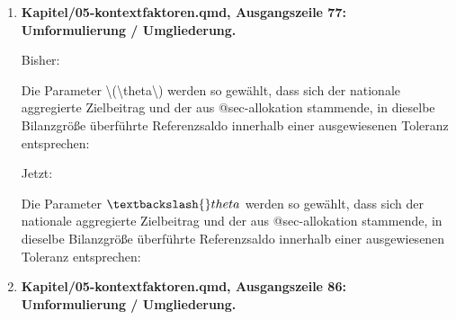 \documentclass[
  ngerman,
  a4paper,
  DIV=11]{scrreprt}
\newenvironment{Shaded}{\begin{snugshade}}{\end{snugshade}}
\newcommand{\NormalTok}[1]{\textcolor[rgb]{0.00,0.23,0.31}{#1}}
\begin{document}
\begin{enumerate}
\begin{Shaded}
\begin{Highlighting}[]
\NormalTok{Die Beiträge \textbackslash{}(b\_\{k,j\}\^{}\{\textbackslash{}mathrm\{ref\}\}\textbackslash{}) und \textbackslash{}(t\_\{k,j\}\^{}\{\textbackslash{}mathrm\{PEQ\}\}\textbackslash{}) müssen hier in derselben auf BGF bezogenen, national aggregierbaren Bilanzgröße ausgedrückt sein. Die Ziel{-} und Flächenbezüge sind vor der Aggregation zu harmonisieren: Ein PEQ{-}Zielwert in kWh PE/(m² NGF·a) kann nicht unmittelbar mit nationaler BGF multipliziert werden. Ebenso kann eine in PJ **elektrischer Energie** ausgewiesene nationale Sektorbilanz nicht ohne Definition und Umrechnung mit einem Primärenergiesaldo gleichgesetzt werden. Diese Umrechnung – einschließlich NGF/BGF und geeigneter PE{-}Gewichtung – gehört ausdrücklich zur Kalibrierrechnung und zu ihrer Dokumentation.}
\end{Highlighting}
\end{Shaded}

  Jetzt:

\begin{Shaded}
\begin{Highlighting}[]
\NormalTok{Die Beiträge werden als jährliche elektrische Energie je BGF aggregiert. Für NGF{-}bezogene Kennwerte gilt der dokumentierte Flächenfaktor; die PE{-}Bewertung folgt getrennt in der Quartiersbilanz.}
\end{Highlighting}
\end{Shaded}
\item
  \textbf{Kapitel/05-kontextfaktoren.qmd, Ausgangszeile 77:
  Umformulierung / Umgliederung.}

  Bisher:

\begin{Shaded}
\begin{Highlighting}[]
\NormalTok{Die Parameter \textbackslash{}(\textbackslash{}theta\textbackslash{}) werden so gewählt, dass sich der nationale aggregierte Zielbeitrag und der aus @sec{-}allokation stammende, in dieselbe Bilanzgröße überführte Referenzsaldo innerhalb einer ausgewiesenen Toleranz entsprechen:}
\end{Highlighting}
\end{Shaded}

  Jetzt:

\begin{Shaded}
\begin{Highlighting}[]
\NormalTok{Die Parameter $\textbackslash{}theta$ werden so gewählt, dass sich der nationale aggregierte Zielbeitrag und der aus @sec{-}allokation stammende, in dieselbe Bilanzgröße überführte Referenzsaldo innerhalb einer ausgewiesenen Toleranz entsprechen:}
\end{Highlighting}
\end{Shaded}
\item
  \textbf{Kapitel/05-kontextfaktoren.qmd, Ausgangszeile 86:
  Umformulierung / Umgliederung.}


\end{enumerate}
\end{document}
